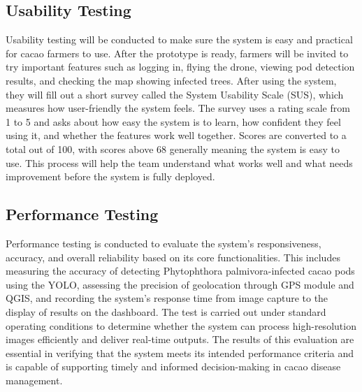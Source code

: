 	\subsection{Usability Testing}
	Usability testing will be conducted to make sure the system is easy and practical for cacao farmers to use. After the prototype is ready, farmers will be invited to try important features such as logging in, flying the drone, viewing pod detection results, and checking the map showing infected trees. After using the system, they will fill out a short survey called the System Usability Scale (SUS), which measures how user-friendly the system feels. The survey uses a rating scale from 1 to 5 and asks about how easy the system is to learn, how confident they feel using it, and whether the features work well together. Scores are converted to a total out of 100, with scores above 68 generally meaning the system is easy to use. This process will help the team understand what works well and what needs improvement before the system is fully deployed.
	
	\subsection{Performance Testing}
	
	Performance testing is conducted to evaluate the system’s responsiveness, accuracy, and overall reliability based on its core functionalities. This includes measuring the accuracy of detecting Phytophthora palmivora-infected cacao pods using the YOLO, assessing the precision of geolocation through GPS module and QGIS, and recording the system’s response time from image capture to the display of results on the dashboard. The test is carried out under standard operating conditions to determine whether the system can process high-resolution images efficiently and deliver real-time outputs. The results of this evaluation are essential in verifying that the system meets its intended performance criteria and is capable of supporting timely and informed decision-making in cacao disease management.
	
